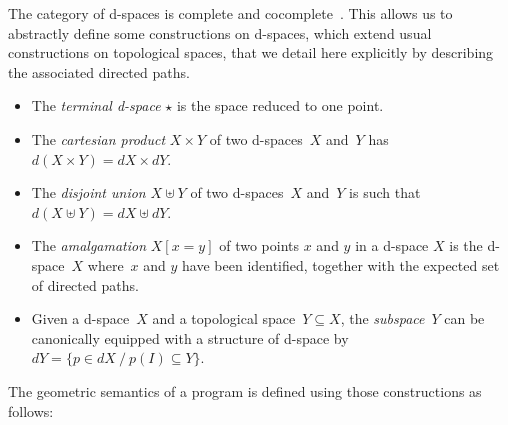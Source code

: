 \documentclass[orivec]{llncs} \usepackage[T1]{fontenc}
\newcommand\set[1]{\{#1\}}
\newcommand\setof[2]{\set{#1\ /\ #2}}
\newcommand{\nbd}{\nobreakdash-\hspace{0pt}}
\begin{document}
The category of d-spaces is complete and cocomplete~\cite{grandis}. This allows
us to abstractly define some constructions on d-spaces, which extend usual
constructions on topological spaces, that we detail here explicitly by
describing the associated directed paths.
\begin{itemize}
\item The \emph{terminal d-space} $\star$ is the space reduced to one
  point.
\item The \emph{cartesian product} $X\times Y$ of two d\nbd{}spaces~$X$ and~$Y$
  has $d(X\times Y)=dX\times dY$.
\item The \emph{disjoint union} $X\uplus Y$ of two d\nbd{}spaces~$X$ and~$Y$ is
  such that $d(X\uplus Y)=dX\uplus dY$.
\item The \emph{amalgamation} $X[x=y]$ of two points $x$ and $y$ in a
  d\nbd{}space $X$ is the d\nbd{}space~$X$ where~$x$ and $y$ have been
  identified, together with the expected set of directed paths.
\item Given a d-space~$X$ and a topological space~$Y\subseteq X$, the
  \emph{subspace}~$Y$ can be canonically equipped with a structure of d-space
  by~$dY=\setof{p\in dX}{p(I)\subseteq Y}$.
\end{itemize}
The geometric semantics of a program is defined using those constructions as
follows:
\end{document}
